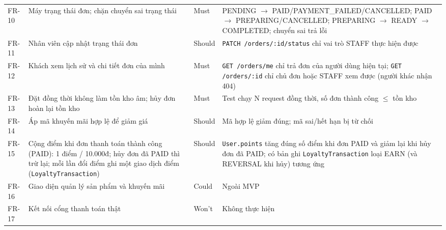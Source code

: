{\begin{longtable}{@{}p{1.2cm}p{5.4cm}p{1.2cm}p{6.6cm}@{}}
FR-10 & Máy trạng thái đơn; chặn chuyển sai trạng thái & Must & PENDING $\to$ PAID/PAYMENT\_FAILED/CANCELLED; PAID $\to$ PREPARING/CANCELLED; PREPARING $\to$ READY $\to$ COMPLETED; chuyển sai trả lỗi \\
FR-11 & Nhân viên cập nhật trạng thái đơn & Should & \texttt{PATCH /\allowbreak{}orders/\allowbreak{}:id/\allowbreak{}status} chỉ vai trò STAFF thực hiện được \\
FR-12 & Khách xem lịch sử và chi tiết đơn của mình & Must & \texttt{GET /\allowbreak{}orders/\allowbreak{}me} chỉ trả đơn của người dùng hiện tại; \texttt{GET /\allowbreak{}orders/\allowbreak{}:id} chỉ chủ đơn hoặc STAFF xem được (người khác nhận 404) \\
FR-13 & Đặt đồng thời không làm tồn kho âm; hủy đơn hoàn lại tồn kho & Must & Test chạy N request đồng thời, số đơn thành công $\leq$ tồn kho \\
FR-14 & Áp mã khuyến mãi hợp lệ để giảm giá & Should & Mã hợp lệ giảm đúng; mã sai/hết hạn bị từ chối \\
FR-15 & Cộng điểm khi đơn thanh toán thành công (PAID): 1 điểm / 10.000đ; hủy đơn đã PAID thì trừ lại; mỗi lần đổi điểm ghi một giao dịch điểm (\texttt{LoyaltyTransaction}) & Should & \texttt{User.points} tăng đúng số điểm khi đơn PAID và giảm lại khi hủy đơn đã PAID; có bản ghi \texttt{LoyaltyTransaction} loại EARN (và REVERSAL khi hủy) tương ứng \\
FR-16 & Giao diện quản lý sản phẩm và khuyến mãi & Could & Ngoài MVP \\
FR-17 & Kết nối cổng thanh toán thật & Won't & Không thực hiện \\
\end{longtable}}


